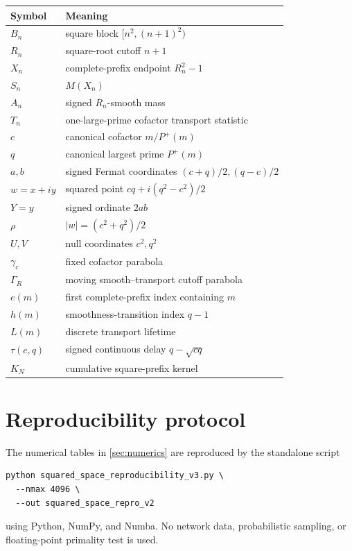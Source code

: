\documentclass[11pt]{article}
\theoremstyle{definition}
\theoremstyle{remark}
\newcommand{\Pplus}{P^{+}}
\newcommand{\1}{\mathbf{1}}
\begin{document}
\begin{table}[htbp]
\centering
\small
\renewcommand{\arraystretch}{1.25}
\begin{tabular}{ll}
\toprule
Symbol & Meaning\\
\midrule
$B_n$ & square block $[n^2,(n+1)^2)$\\
$R_n$ & square-root cutoff $n+1$\\
$X_n$ & complete-prefix endpoint $R_n^2-1$\\
$S_n$ & $M(X_n)$\\
$A_n$ & signed $R_n$-smooth mass\\
$T_n$ & one-large-prime cofactor transport statistic\\
$c$ & canonical cofactor $m/\Pplus(m)$\\
$q$ & canonical largest prime $\Pplus(m)$\\
$a,b$ & signed Fermat coordinates $(c+q)/2,(q-c)/2$\\
$w=x+iy$ & squared point $cq+i(q^2-c^2)/2$\\
$Y=y$ & signed ordinate $2ab$\\
$\rho$ & $|w|=(c^2+q^2)/2$\\
$U,V$ & null coordinates $c^2,q^2$\\
$\gamma_c$ & fixed cofactor parabola\\
$\Gamma_R$ & moving smooth--transport cutoff parabola\\
$e(m)$ & first complete-prefix index containing $m$\\
$h(m)$ & smoothness-transition index $q-1$\\
$L(m)$ & discrete transport lifetime\\
$\tau(c,q)$ & signed continuous delay $q-\sqrt{cq}$\\
$K_N$ & cumulative square-prefix kernel\\
\bottomrule
\end{tabular}
\end{table}

\section{Reproducibility protocol}
\label{app:reproducibility}

The numerical tables in \cref{sec:numerics} are reproduced by the
standalone script
\begin{verbatim}
python squared_space_reproducibility_v3.py \
  --nmax 4096 \
  --out squared_space_repro_v2
\end{verbatim}
using Python, NumPy, and Numba.  No network data, probabilistic
sampling, or floating-point primality test is used.
\end{document}
